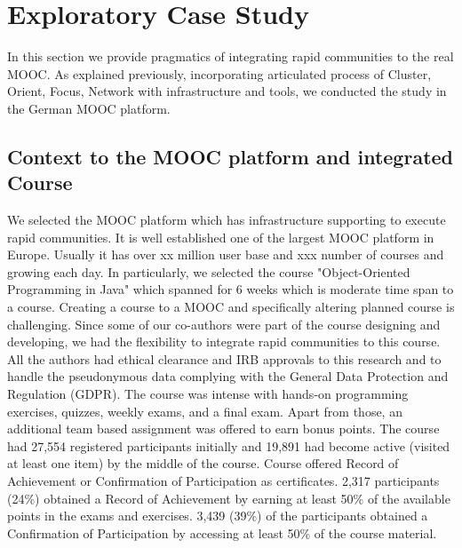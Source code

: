 \documentclass[manuscript,screen,review]{acmart}
\begin{document}



\section{Exploratory Case Study}
In this section we provide pragmatics of integrating rapid communities to the real MOOC. As explained previously, incorporating articulated process of Cluster, Orient, Focus, Network with infrastructure and tools, we conducted the study in the German MOOC platform. 

\subsection{Context to the MOOC platform and integrated Course}
We selected the MOOC platform which has infrastructure supporting to execute rapid communities. It is well established one of the largest MOOC platform in Europe. Usually it has over xx million user base and xxx number of courses and growing each day. In particularly, we selected the course "Object-Oriented Programming in Java" which spanned for 6 weeks which is moderate time span to a course. Creating a course to a MOOC and specifically altering planned course is challenging. Since some of our co-authors were part of the course designing and developing, we had the flexibility to integrate rapid communities to this course. All the authors had ethical clearance and IRB approvals to this research and to handle the pseudonymous data complying with the General Data Protection and Regulation (GDPR). The course was intense with hands-on programming exercises, quizzes, weekly exams, and a final exam. Apart from those, an additional team based assignment was offered to earn bonus points. The course had 27,554 registered participants initially and 19,891 had become active (visited at least one item) by the middle of the course. Course offered Record of Achievement or Confirmation of Participation as certificates. 2,317 participants (24\%) obtained a Record of Achievement by earning at least 50\% of the available points in the exams and exercises. 3,439 (39\%) of the participants obtained a Confirmation of Participation by accessing at least 50\% of the course material. 
\end{document}
